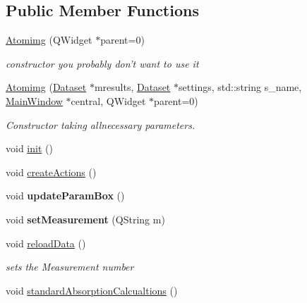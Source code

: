 \subsection*{Public Member Functions}
\begin{DoxyCompactItemize}
\item 
\hypertarget{class_atomimg_a0a30432dc3d185b6a90261d3c9b20de1}{
\hyperlink{class_atomimg_a0a30432dc3d185b6a90261d3c9b20de1}{Atomimg} (QWidget $\ast$parent=0)}
\label{class_atomimg_a0a30432dc3d185b6a90261d3c9b20de1}

\begin{DoxyCompactList}\small\item\em constructor you probably don't want to use it \item\end{DoxyCompactList}\item 
\hyperlink{class_atomimg_ac18f2c96b38db252d9a92be2fd5746f5}{Atomimg} (\hyperlink{class_dataset}{Dataset} $\ast$mresults, \hyperlink{class_dataset}{Dataset} $\ast$settings, std::string s\_\-name, \hyperlink{class_main_window}{MainWindow} $\ast$central, QWidget $\ast$parent=0)
\begin{DoxyCompactList}\small\item\em Constructor taking allnecessary parameters. \item\end{DoxyCompactList}\item 
void \hyperlink{class_atomimg_a5ceab12f92f73a0401f5f63e2c93a79b}{init} ()
\item 
void \hyperlink{class_atomimg_aff959b1f93ea79d96f406b7c575b0acf}{createActions} ()
\item 
\hypertarget{class_atomimg_ac8170fa51d538f7a265513f916e55826}{
void {\bfseries updateParamBox} ()}
\label{class_atomimg_ac8170fa51d538f7a265513f916e55826}

\item 
\hypertarget{class_atomimg_afc40cec6c21314c3cb57bf7dc8f6220c}{
void {\bfseries setMeasurement} (QString m)}
\label{class_atomimg_afc40cec6c21314c3cb57bf7dc8f6220c}

\item 
void \hyperlink{class_atomimg_a7e02e49acf137262682e359e4f4fdac9}{reloadData} ()
\begin{DoxyCompactList}\small\item\em sets the Measurement number \item\end{DoxyCompactList}\item 
\hypertarget{class_atomimg_a24675d59f7e568619b220ddb29bda231}{
void \hyperlink{class_atomimg_a24675d59f7e568619b220ddb29bda231}{standardAbsorptionCalcualtions} ()}
\label{class_atomimg_a24675d59f7e568619b220ddb29bda231}


\end{DoxyCompactItemize}
